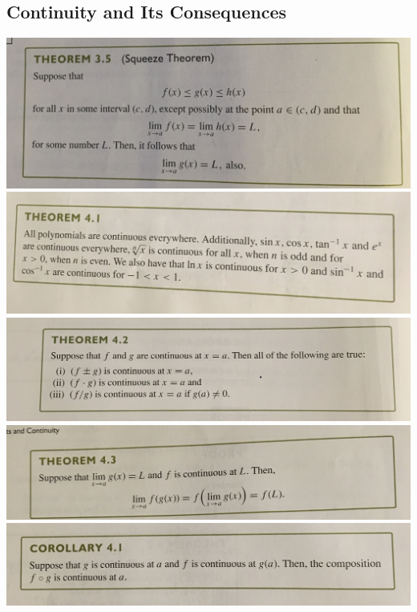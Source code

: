 \documentclass{article}
\begin{document}
    \subsection{Continuity and Its Consequences}

    \includegraphics[width=\linewidth]{Pre-Reading/Chapter 1/IMG_0961.JPG}
    \includegraphics[width=\linewidth]{Pre-Reading/Chapter 1/IMG_0965.JPG}
    \includegraphics[width=\linewidth]{Pre-Reading/Chapter 1/IMG_0966.JPG}
    \includegraphics[width=\linewidth]{Pre-Reading/Chapter 1/IMG_0967.JPG}
    \includegraphics[width=\linewidth]{Pre-Reading/Chapter 1/IMG_0968.JPG}
\end{document}
